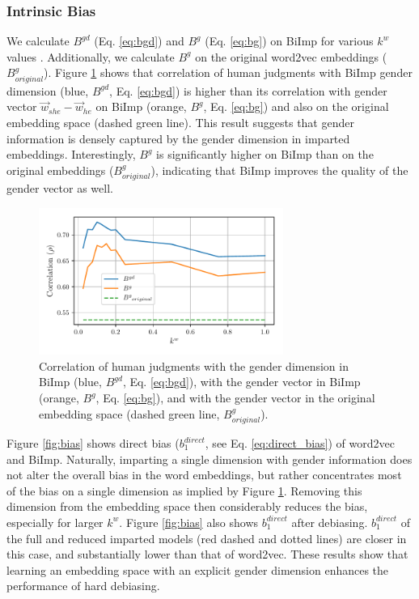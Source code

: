 \documentclass[11pt,a4paper]{article}
\def\proposedmethod{BiImp}
\begin{document}
\subsubsection{Intrinsic Bias}
We calculate $B^{gd}$ (Eq. \ref{eq:bgd}) and $B^{g}$ (Eq. \ref{eq:bg}) on \proposedmethod{} for various $k^w$ values
. Additionally, we calculate $B^{g}$ on the original word2vec embeddings ($B^{g}_{original}$).
Figure \ref{fig:corr} shows that correlation of human judgments with \proposedmethod{} gender dimension (blue, $B^{gd}$, Eq. \ref{eq:bgd}) is higher than its correlation with gender vector $\vec{w}_{she} - \vec{w}_{he}$ on \proposedmethod{} (orange, $B^{g}$, Eq. \ref{eq:bg}) and also on the original embedding space (dashed green line). This result suggests that gender information
is densely captured by the gender dimension in imparted
embeddings. Interestingly, $B^{g}$ is significantly higher on \proposedmethod{} than on the original embeddings ($B^{g}_{original}$), indicating that \proposedmethod{} improves the quality of the gender vector as well.


\begin{figure}[h]
 	\centering
	\includegraphics[width=8.0cm]{Figures/gender_correlation.pdf}
	\caption{Correlation of human judgments with the gender dimension in \proposedmethod{} (blue, $B^{gd}$, Eq. \ref{eq:bgd}), with the gender vector in \proposedmethod{} (orange, $B^{g}$, Eq. \ref{eq:bg}), and with the gender vector in the original embedding space (dashed green line, $B^{g}_{original}$).}
	\label{fig:corr}
\end{figure}

Figure \ref{fig:bias}
shows direct bias
          ($b^{direct}_1$, see Eq. \ref{eq:direct_bias})
of word2vec and \proposedmethod{}.
Naturally, imparting  a single
dimension with
gender information 
does not alter the overall bias in the word
 embeddings, but rather concentrates most of the bias on a
 single dimension as implied by Figure
 \ref{fig:corr}. Removing this dimension from the embedding
 space then considerably reduces the bias, especially for
 larger $k^w$. Figure \ref{fig:bias} also shows 
 $b^{direct}_1$
after debiasing.
$b^{direct}_1$
of the full and reduced imparted models (red dashed
 and dotted lines) are closer in this case, and
 substantially lower than that of word2vec. These results show that learning
   an embedding space with an explicit gender dimension
   enhances the performance of hard debiasing.
\end{document}
